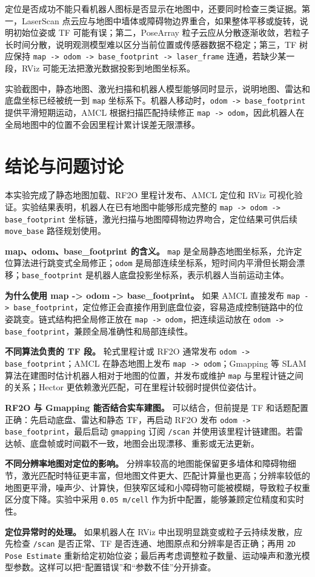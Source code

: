 \documentclass[11pt,a4paper,fontset=fandol]{ctexart}
\begin{document}
定位是否成功不能只看机器人图标是否显示在地图中，还要同时检查三类证据。第一，LaserScan 点云应与地图中墙体或障碍物边界重合，如果整体平移或旋转，说明初始位姿或 TF 可能有误；第二，PoseArray 粒子云应从分散逐渐收敛，若粒子长时间分散，说明观测模型难以区分当前位置或传感器数据不稳定；第三，TF 树应保持 \verb|map -> odom -> base_footprint -> laser_frame| 连通，若缺少某一段，RViz 可能无法把激光数据投影到地图坐标系。

实验截图中，静态地图、激光扫描和机器人模型能够同时显示，说明地图、雷达和底盘坐标已经被统一到 \verb|map| 坐标系下。机器人移动时，\verb|odom -> base_footprint| 提供平滑短期运动，AMCL 根据扫描匹配持续修正 \verb|map -> odom|，因此机器人在全局地图中的位置不会因里程计累计误差无限漂移。

\newpage
\section{结论与问题讨论}

本实验完成了静态地图加载、RF2O 里程计发布、AMCL 定位和 RViz 可视化验证。实验结果表明，机器人在已有地图中能够形成完整的 \verb|map -> odom -> base_footprint| 坐标链，激光扫描与地图障碍物边界吻合，定位结果可供后续 \verb|move_base| 路径规划使用。

\textbf{map、odom、base\_footprint 的含义。}
\verb|map| 是全局静态地图坐标系，允许定位算法进行跳变式全局修正；\verb|odom| 是局部连续坐标系，短时间内平滑但长期会漂移；\verb|base_footprint| 是机器人底盘投影坐标系，表示机器人当前运动主体。

\textbf{为什么使用 map -> odom -> base\_footprint。}
如果 AMCL 直接发布 \verb|map -> base_footprint|，定位修正会直接作用到底盘位姿，容易造成控制链路中的位姿跳变。链式结构把全局修正放在 \verb|map -> odom|，把连续运动放在 \verb|odom -> base_footprint|，兼顾全局准确性和局部连续性。

\textbf{不同算法负责的 TF 段。}
轮式里程计或 RF2O 通常发布 \verb|odom -> base_footprint|；AMCL 在静态地图上发布 \verb|map -> odom|；Gmapping 等 SLAM 算法在建图时估计机器人相对于地图的位置，并发布或维护 \verb|map| 与里程计链之间的关系；Hector 更依赖激光匹配，可在里程计较弱时提供位姿估计。

\textbf{RF2O 与 Gmapping 能否结合实车建图。}
可以结合，但前提是 TF 和话题配置正确：先启动底盘、雷达和静态 TF，再启动 RF2O 发布 \verb|odom -> base_footprint|，最后启动 \verb|gmapping| 订阅 \verb|/scan| 并使用该里程计链建图。若雷达帧、底盘帧或时间戳不一致，地图会出现漂移、重影或无法更新。

\textbf{不同分辨率地图对定位的影响。}
分辨率较高的地图能保留更多墙体和障碍物细节，激光匹配时特征更丰富，但地图文件更大、匹配计算量也更高；分辨率较低的地图更平滑，噪声少、计算快，但狭窄区域和小障碍物可能被模糊，导致粒子权重区分度下降。实验中采用 \verb|0.05 m/cell| 作为折中配置，能够兼顾定位精度和实时性。

\textbf{定位异常时的处理。}
如果机器人在 RViz 中出现明显跳变或粒子云持续发散，应先检查 \verb|/scan| 是否正常、TF 是否连通、地图原点和分辨率是否正确；再用 \verb|2D Pose Estimate| 重新给定初始位姿；最后再考虑调整粒子数量、运动噪声和激光模型参数。这样可以把“配置错误”和“参数不佳”分开排查。
\end{document}
